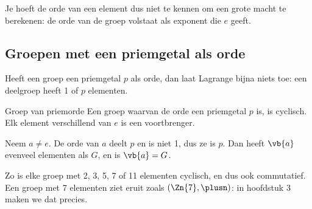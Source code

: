 Je hoeft de orde van een element dus niet te kennen om een grote macht te berekenen: de orde van de groep volstaat als exponent die $e$ geeft.


\subsection{Groepen met een priemgetal als orde}

Heeft een groep een priemgetal $p$ als orde, dan laat Lagrange bijna niets toe: een deelgroep heeft 1 of $p$ elementen.

\begin{theorie}
\begin{stelling}{Groep van priemorde}
Een groep waarvan de orde een priemgetal $p$ is, is cyclisch. Elk element verschillend van $e$ is een voortbrenger.
\end{stelling}

\begin{bewijs}
Neem $a \neq e$. De orde van $a$ deelt $p$ en is niet 1, dus ze is $p$. Dan heeft $\vb{a}$ evenveel elementen als $G$, en is $\vb{a} = G$.
\end{bewijs}
\end{theorie}

Zo is elke groep met 2, 3, 5, 7 of 11 elementen cyclisch, en dus ook commutatief. Een groep met 7 elementen ziet eruit zoals $(\Zn{7}, \plusn)$: in hoofdstuk 3 maken we dat precies.


